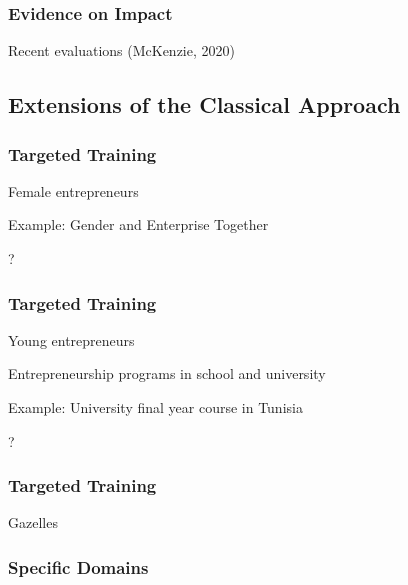 \documentclass[hideothersubsections, usenames,dvipsnames,10pt]{beamer}
\newenvironment{itemize_3pt}{\itemize\addtolength{\itemsep}{3pt}}{\enditemize}
\begin{document}
\begin{frame}
\frametitle{Evidence on Impact}
	\begin{itemize_3pt}
	\item Recent evaluations (McKenzie, 2020) \citep{McKenzie2020}
	\vspace{0.1in}
	\end{itemize_3pt}
\end{frame}


\subsection{Extensions of the Classical Approach}

\begin{frame}
\frametitle{Targeted Training}
	Female entrepreneurs
	\begin{itemize_3pt}
		\item Example: Gender and Enterprise Together \citep[GET Ahead, ILO;][]{Bulte2016,McKenziePuerto2020}
		\item ?
	\vspace{0.1in}
	\end{itemize_3pt}
\end{frame}

\begin{frame}
\frametitle{Targeted Training}
	Young entrepreneurs
	\begin{itemize_3pt}
		\item Entrepreneurship programs in school and university
		\item Example: University final year course in Tunisia \citep{Alaref2020}
		\item ?
	\vspace{0.1in}
	\end{itemize_3pt}
\end{frame}

\begin{frame}
\frametitle{Targeted Training}
	\begin{itemize_3pt}
	\item Gazelles
	\vspace{0.1in}
	\end{itemize_3pt}
\end{frame}


\begin{frame}
\frametitle{Specific Domains}
	\begin{itemize_3pt}
	\item \citep{Anderson2018}
	\vspace{0.1in}
	\end{itemize_3pt}
\end{frame}
\end{document}

